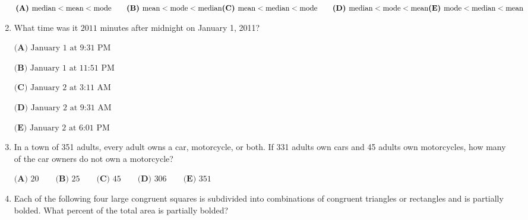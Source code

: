 \documentclass{article}
\begin{document}
\begin{enumerate}[label=\arabic*., itemsep=0.5em]
\(\textbf{(A) }\text{median} < \text{mean} < \text{mode} \qquad \textbf{(B) }\text{mean} < \text{mode} < \text{median} \\ \\ \textbf{(C) }\text{mean} < \text{median} < \text{mode} \qquad \textbf{(D) }\text{median} < \text{mode} < \text{mean} \\ \\ \textbf{(E) }\text{mode} < \text{median} < \text{mean}\)\par \vspace{0.5em}\item What time was it \(2011\) minutes after midnight on January 1, 2011?

\(\textbf{(A) }\text{January 1 at 9:31 PM}\)

\(\textbf{(B) }\text{January 1 at 11:51 PM}\) 

\(\textbf{(C) }\text{January 2 at 3:11 AM}\) 

\(\textbf{(D) }\text{January 2 at 9:31 AM}\) 

\(\textbf{(E) }\text{January 2 at 6:01 PM}\)\par \vspace{0.5em}\item In a town of 351 adults, every adult owns a car, motorcycle, or both. If 331 adults own cars and 45 adults own motorcycles, how many of the car owners do not own a motorcycle?

\( \textbf{(A) }20 \qquad\textbf{(B) }25 \qquad\textbf{(C) }45 \qquad\textbf{(D) }306 \qquad\textbf{(E) }351\)\par \vspace{0.5em}\item Each of the following four large congruent squares is subdivided into combinations of congruent triangles or rectangles and is partially bolded. What percent of the total area is partially bolded?



\end{enumerate}
\end{document}
